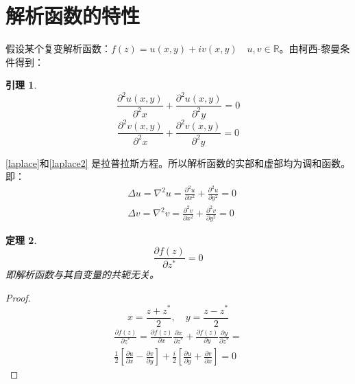\documentclass[10pt, a4paper, oneside]{ctexbook}
\newtheorem{theorem}{定理}[section]
\newtheorem{lemma}[theorem]{引理}
\begin{document}
\section{解析函数的特性}
假设某个复变解析函数：$f(z)=u(x,y)+iv(x,y)\quad u,v\in \mathbb{R}$。由柯西-黎曼条件得到：
\begin{lemma}
    \begin{equation}
    \label{laplace}
        \frac{\displaystyle \partial^2 u(x,y)}{ \displaystyle \partial^2 x}+\frac{\displaystyle \partial^2 u(x,y)}{\displaystyle \partial^2 y}=0
    \end{equation}
    \begin{equation}
        \label{laplace2}
            \frac{\displaystyle \partial^2 v(x,y)}{ \displaystyle \partial^2 x}+\frac{\displaystyle \partial^2 v(x,y)}{\displaystyle \partial^2 y}=0
        \end{equation}
\end{lemma}
\ref{laplace}和\ref{laplace2} 是拉普拉斯方程。所以解析函数的实部和虚部均为调和函数。即：
\begin{equation*}
    \begin{aligned}
    &\Delta u=\nabla^{2} u=\frac{\partial^{2} u}{\partial x^{2}}+\frac{\partial^{2} u}{\partial y^{2}}=0 \\
    &\Delta v=\nabla^{2} v=\frac{\partial^{2} v}{\partial x^{2}}+\frac{\partial^{2} v}{\partial y^{2}}=0
    \end{aligned}
    \end{equation*}
\begin{theorem}
    $$\frac{\displaystyle \partial f(z)}{ \displaystyle \partial z^*}=0$$
    即解析函数与其自变量的共轭无关。
\end{theorem}
\begin{proof}
    $$x=\frac{z+z^*}{2},\quad y=\frac{z-z^*}{2}$$
    \begin{align*}
    \frac{\displaystyle \partial f(z)}{ \displaystyle \partial z^*}=\frac{\displaystyle \partial f(z)}{ \displaystyle \partial x}\frac{\displaystyle \partial x}{ \displaystyle \partial z^*}+\frac{\displaystyle \partial f(z)}{ \displaystyle \partial y}\frac{\displaystyle \partial y}{ \displaystyle \partial z^*}=\\
    \frac{1}{2}\left[\frac{\displaystyle \partial u}{ \displaystyle \partial x}-\frac{\displaystyle \partial v}{ \displaystyle \partial y}\right]+\frac{i}{2}\left[ \frac{\displaystyle \partial u}{ \displaystyle \partial y}+\frac{\displaystyle \partial v}{ \displaystyle \partial x} \right]=0
    \end{align*}
\end{proof}
\end{document}
